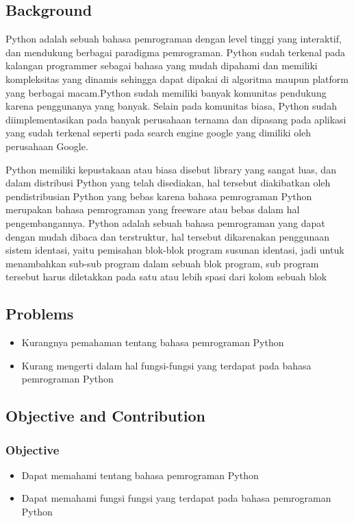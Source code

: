     \subsection{Background}
    \label{Background}
    \par
    Python adalah sebuah bahasa pemrograman dengan level tinggi yang interaktif, dan mendukung berbagai paradigma pemrograman. Python sudah terkenal pada kalangan programmer sebagai bahasa yang mudah dipahami dan memiliki kompleksitas yang dinamis sehingga dapat dipakai di algoritma maupun platform yang berbagai macam.Python sudah memiliki banyak komunitas pendukung karena penggunanya yang banyak. Selain pada komunitas biasa, Python sudah diimplementasikan pada banyak perusahaan ternama dan dipasang pada aplikasi yang sudah terkenal seperti pada search engine google yang dimiliki oleh perusahaan Google.
    \par
    Python memiliki kepustakaan atau biasa disebut library yang sangat luas, dan dalam distribusi Python yang telah disediakan, hal tersebut diakibatkan oleh pendistribusian Python yang bebas karena bahasa pemrograman Python merupakan bahasa pemrograman yang freeware atau bebas dalam hal pengembangannya. Python adalah sebuah bahasa pemrograman yang dapat dengan mudah dibaca dan terstruktur, hal tersebut dikarenakan penggunaan sistem identasi, yaitu pemisahan blok-blok program susunan identasi, jadi untuk menambahkan sub-sub program dalam sebuah blok program, sub program tersebut harus diletakkan pada satu atau lebih spasi dari kolom sebuah blok
    \subsection{Problems}
        \begin{itemize}
            \item Kurangnya pemahaman tentang bahasa pemrograman Python
            \item Kurang mengerti dalam hal fungsi-fungsi yang terdapat pada bahasa pemrograman Python
        \end{itemize}

    \subsection{Objective and Contribution}
        \subsubsection{Objective}
            \begin{itemize}
                \item Dapat memahami tentang bahasa pemrograman Python
                \item Dapat memahami fungsi fungsi yang terdapat pada bahasa pemrograman Python
            \end{itemize}

